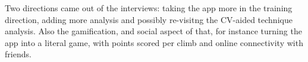 Two directions came out of the interviews:
taking the app more in the training direction, adding more analysis and possibly re-visitng the CV-aided technique analysis.
Also the gamification, and social aspect of that, for instance turning the app into a literal game, with points scored per climb and online connectivity with friends.




